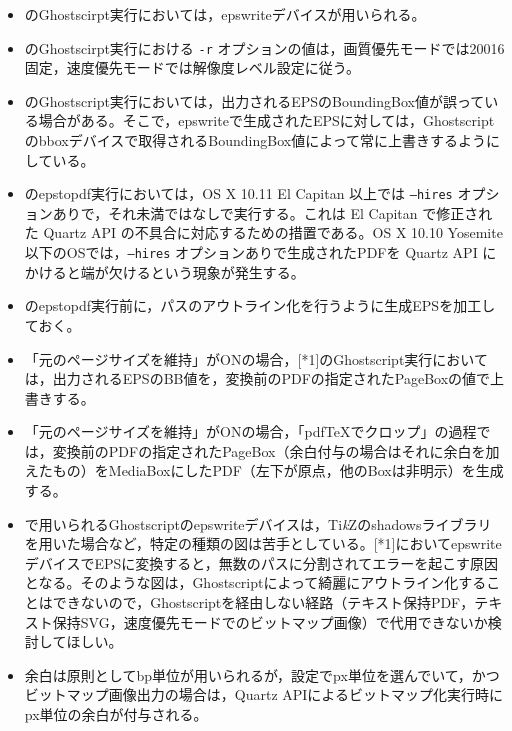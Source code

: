 \documentclass[uplatex,dvipdfmx,landscape]{jsarticle}
\newcommand*\TikZ{Ti\textit{k}Z}
\begin{document}
{\baselineskip18pt
\begin{itemize}[leftmargin=2zw]
\item\relax[*1]のGhostscirpt実行においては，epswriteデバイスが用いられる。
\item\relax[*1]のGhostscirpt実行における \texttt{-r} オプションの値は，画質優先モードでは20016固定，速度優先モードでは解像度レベル設定に従う。
\item\relax[*1]のGhostscript実行においては，出力されるEPSのBoundingBox値が誤っている場合がある。そこで，epswriteで生成されたEPSに対しては，Ghostscriptのbboxデバイスで取得されるBoundingBox値によって常に上書きするようにしている。
\item\relax[*2]のepstopdf実行においては，OS X 10.11 El Capitan 以上では \texttt{--hires} オプションありで，それ未満ではなしで実行する。これは El Capitan で修正された Quartz API の不具合に対応するための措置である。OS X 10.10 Yosemite 以下のOSでは，\texttt{--hires} オプションありで生成されたPDFを Quartz API にかけると端が欠けるという現象が発生する。
\item\relax[*3]のepstopdf実行前に，パスのアウトライン化を行うように生成EPSを加工しておく。
\item 「元のページサイズを維持」がONの場合，[*1]のGhostscript実行においては，出力されるEPSのBB値を，変換前のPDFの指定されたPageBoxの値で上書きする。
\item 「元のページサイズを維持」がONの場合，「pdf\TeX でクロップ」の過程では，変換前のPDFの指定されたPageBox（余白付与の場合はそれに余白を加えたもの）をMediaBoxにしたPDF（左下が原点，他のBoxは非明示）を生成する。
\item\relax[*1]で用いられるGhostscriptのepswriteデバイスは，\TikZ のshadowsライブラリを用いた場合など，特定の種類の図は苦手としている。[*1]においてepswriteデバイスでEPSに変換すると，無数のパスに分割されてエラーを起こす原因となる。そのような図は，Ghostscriptによって綺麗にアウトライン化することはできないので，Ghostscriptを経由しない経路（テキスト保持PDF，テキスト保持SVG，速度優先モードでのビットマップ画像）で代用できないか検討してほしい。
\item 余白は原則としてbp単位が用いられるが，設定でpx単位を選んでいて，かつビットマップ画像出力の場合は，Quartz APIによるビットマップ化実行時にpx単位の余白が付与される。
\end{itemize}
}
\end{document}
